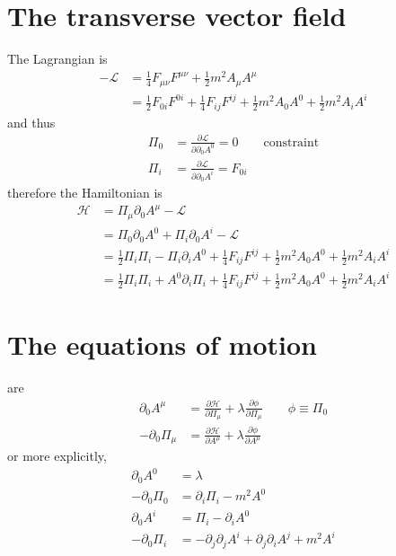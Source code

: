 \documentclass[12pt, oneside]{book}
\begin{document}
\section*{The transverse vector field}
The Lagrangian is
\begin{align*}
-\mathcal{L}
&=\tfrac14F_{\mu\nu}F^{\mu\nu}+\tfrac12m^2A_{\mu}A^{\mu}\\
&=\tfrac12F_{0i}F^{0i}+\tfrac14F_{ij}F^{ij}+\tfrac12m^2A_0A^0+\tfrac12m^2A_iA^i
\end{align*}
and thus
\begin{align*}
\Pi_0&=\frac{\partial\mathcal{L}}{\partial\partial_0A^0}=0\qquad
\text{constraint}\\
\Pi_i&=\frac{\partial\mathcal{L}}{\partial\partial_0A^i}=F_{0i}
\end{align*}
therefore the Hamiltonian is
\begin{align*}
\mathcal{H}
&=\Pi_{\mu}\partial_0A^{\mu}-\mathcal{L}\\
&=\Pi_0\partial_0A^0+\Pi_i\partial_0A^i-\mathcal{L}\\
&=\tfrac12\Pi_i\Pi_i-\Pi_i\partial_iA^0+\tfrac14F_{ij}F^{ij}+\tfrac12m^2A_0A^0+\tfrac12m^2A_iA^i\\
&=\tfrac12\Pi_i\Pi_i+A^0\partial_i\Pi_i+\tfrac14F_{ij}F^{ij}+\tfrac12m^2A_0A^0+\tfrac12m^2A_iA^i
\end{align*}

\section*{The equations of motion}
are
\begin{align*}
\partial_0A^{\mu}&=\frac{\partial\mathcal{H}}{\partial\Pi_{\mu}}+\lambda\frac{\partial\phi}{\partial\Pi_{\mu}}\qquad
\phi\equiv\Pi_0\\
-\partial_0\Pi_{\mu}&=\frac{\partial\mathcal{H}}{\partial A^{\mu}}+\lambda\frac{\partial\phi}{\partial A^{\mu}}
\end{align*}
or more explicitly,
\begin{align*}
\partial_0A^0&=\lambda\\
-\partial_0\Pi_0&=\partial_i\Pi_i-m^2A^0\\[5pt]
\partial_0A^i&=\Pi_i-\partial_iA^0\\
-\partial_0\Pi_i&=-\partial_j\partial_jA^i+\partial_j\partial_iA^j+m^2A^i
\end{align*}
\end{document}
